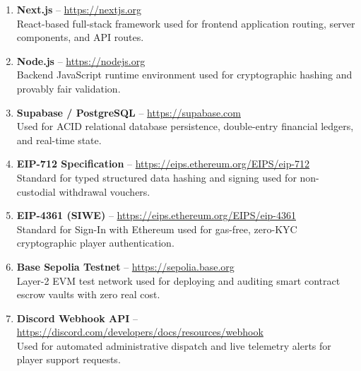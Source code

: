 \begin{enumerate}[leftmargin=1.8em,itemsep=0.8em]
    \item \textbf{Next.js} -- \url{https://nextjs.org} \\
    React-based full-stack framework used for frontend application routing, server components, and API routes.

    \item \textbf{Node.js} -- \url{https://nodejs.org} \\
    Backend JavaScript runtime environment used for cryptographic hashing and provably fair validation.

    \item \textbf{Supabase / PostgreSQL} -- \url{https://supabase.com} \\
    Used for ACID relational database persistence, double-entry financial ledgers, and real-time state.

    \item \textbf{EIP-712 Specification} -- \url{https://eips.ethereum.org/EIPS/eip-712} \\
    Standard for typed structured data hashing and signing used for non-custodial withdrawal vouchers.

    \item \textbf{EIP-4361 (SIWE)} -- \url{https://eips.ethereum.org/EIPS/eip-4361} \\
    Standard for Sign-In with Ethereum used for gas-free, zero-KYC cryptographic player authentication.

    \item \textbf{Base Sepolia Testnet} -- \url{https://sepolia.base.org} \\
    Layer-2 EVM test network used for deploying and auditing smart contract escrow vaults with zero real cost.

    \item \textbf{Discord Webhook API} -- \url{https://discord.com/developers/docs/resources/webhook} \\
    Used for automated administrative dispatch and live telemetry alerts for player support requests.
\end{enumerate}
\label{chap:reference_end}
